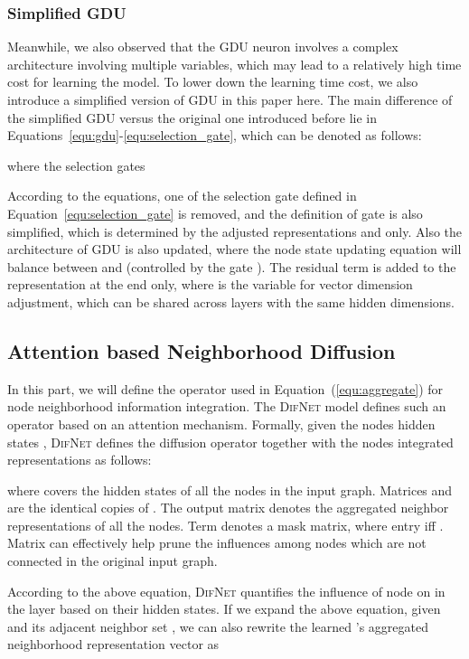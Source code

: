 \documentclass{article}
\newcommand{\our}{\textsc{DifNet}}
\newcommand{\gdu}{\textsc{GDU}}
\begin{document}
\subsubsection{Simplified {\gdu}}

Meanwhile, we also observed that the {\gdu} neuron involves a complex architecture involving multiple variables, which may lead to a relatively high time cost for learning the model. To lower down the learning time cost, we also introduce a simplified version of {\gdu} in this paper here. The main difference of the simplified {\gdu} versus the original one introduced before lie in Equations~\ref{equ:gdu}-\ref{equ:selection_gate}, which can be denoted as follows:

where the selection gates

According to the equations, one of the selection gate  defined in Equation~\ref{equ:selection_gate} is removed, and the definition of gate  is also simplified, which is determined by the adjusted representations  and  only. Also the architecture of {\gdu} is also updated, where the node state updating equation will balance between  and  (controlled by the gate ). The residual term  is added to the representation at the end only, where  is the variable for vector dimension adjustment, which can be shared across layers with the same hidden dimensions.


\subsection{Attention based Neighborhood Diffusion}\label{subsec:aggregation}

In this part, we will define the  operator used in Equation~(\ref{equ:aggregate}) for node neighborhood information integration. The {\our} model defines such an operator based on an attention mechanism. Formally, given the nodes hidden states , {\our} defines the diffusion operator together with the nodes integrated representations as follows:

where  covers the hidden states of all the nodes in the input graph. Matrices  and  are the identical copies of . The output matrix  denotes the aggregated neighbor representations of all the nodes. Term  denotes a mask matrix, where entry  iff . Matrix  can effectively help prune the influences among nodes which are not connected in the original input graph.

According to the above equation, {\our} quantifies the influence of node  on  in the  layer based on their hidden states. If we expand the above equation, given  and its adjacent neighbor set , we can also rewrite the learned 's aggregated neighborhood representation vector as
\end{document}
